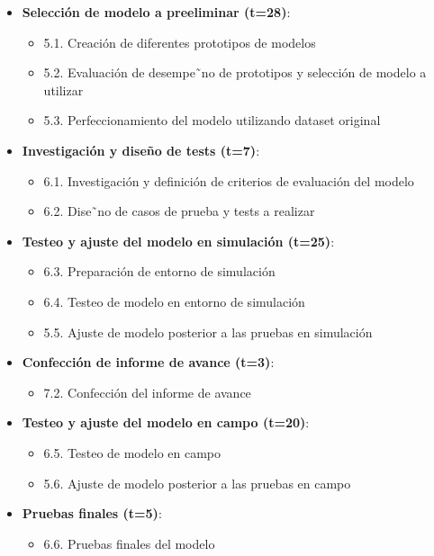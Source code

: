 \documentclass[
11pt, %
]{charter}
\begin{document}
\begin{itemize}
\item \textbf{Selección de modelo a preeliminar (t=28)}:
\begin{itemize}
\item 5.1. Creación de diferentes prototipos de modelos
\item 5.2. Evaluación de desempe˜no de prototipos y selección de modelo a utilizar
\item 5.3. Perfeccionamiento del modelo utilizando dataset original
\end{itemize}

\item \textbf{Investigación y diseño de tests (t=7)}:
\begin{itemize}
\item 6.1. Investigación y definición de criterios de evaluación del modelo
\item 6.2. Dise˜no de casos de prueba y tests a realizar
\end{itemize}

\item \textbf{Testeo y ajuste del modelo en simulación (t=25)}:
\begin{itemize}
\item 6.3. Preparación de entorno de simulación
\item 6.4. Testeo de modelo en entorno de simulación
\item 5.5. Ajuste de modelo posterior a las pruebas en simulación
\end{itemize}

\item \textbf{Confección de informe de avance (t=3)}:
\begin{itemize}
\item 7.2. Confección del informe de avance
\end{itemize}

\item \textbf{Testeo y ajuste del modelo en campo (t=20)}:
\begin{itemize}
\item 6.5. Testeo de modelo en campo
\item 5.6. Ajuste de modelo posterior a las pruebas en campo
\end{itemize}

\item \textbf{Pruebas finales (t=5)}:
\begin{itemize}
\item 6.6. Pruebas finales del modelo
\end{itemize}


\end{itemize}
\end{document}
